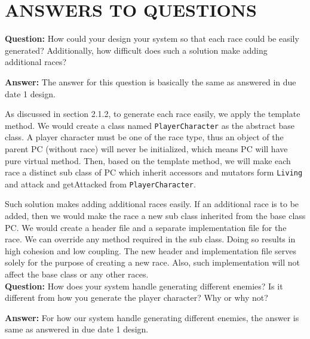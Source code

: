 \documentclass[11pt]{article}
\theoremstyle{plain} \newtheorem{theorem*}{Theorem}[subsection]
\begin{document}
\vspace{0.3 in}
\section{ANSWERS TO QUESTIONS}

\textbf{Question:}
How could your design your system so that each race could be easily generated?
Additionally, how difficult does such a solution make adding additional races? 

\textbf{Answer:}
The answer for this question is basically the same as answered in due date 1
design. 

As discussed in section 2.1.2, to generate each race easily, 
we apply the template method.
We would create a class named \texttt{PlayerCharacter} as the abstract base
class. A player character must be one of the race type, thus an object of the
parent PC (without race) will never be initialized, which means PC will have
pure virtual method. Then, based on the template method, we
will make each race a distinct sub class of PC which inherit accessors and
mutators form \texttt{Living} and \textsf{attack} and \textsf{getAttacked}
from \texttt{PlayerCharacter}.


Such solution makes adding additional races easily. If an additional race is to
be added, then we would make the race a new sub class inherited from the base
class PC. We would create a header file and a separate implementation file for
the race. We can override any method required in the sub class. Doing so
results in high cohesion and low coupling. The new header and implementation
file serves solely for the purpose of creating a new race. Also, such
implementation will not affect the base class or any other races.	\\

\textbf{Question:}
How does your system handle generating different enemies? Is it different from
how you generate the player character? Why or why not? 

\textbf{Answer:}
For how our system handle generating different enemies, the answer is same as
answered in due date 1 design. 
\end{document}
